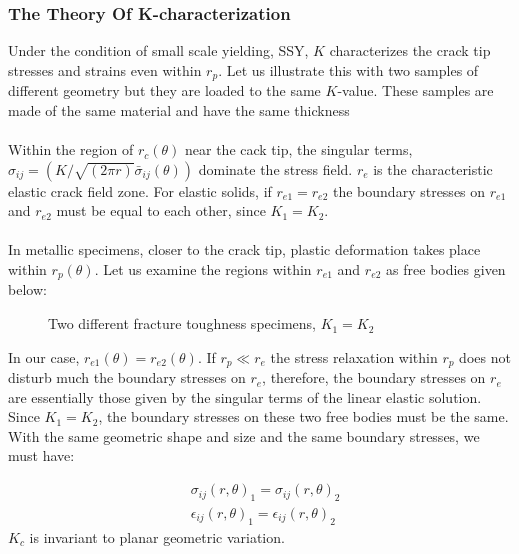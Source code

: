 \documentclass[11pt]{article}
\begin{document}
\subsubsection{The Theory Of K-characterization}
Under the condition of small scale yielding, SSY, $K$ characterizes the crack tip stresses and strains
even within $r_p$. Let us illustrate this with two samples of different geometry but they are loaded to the
same $K$-value. These samples are made of the same material and have the same thickness
\\\\
Within the region of $r_c(\theta)$ near the cack tip, the singular terms, $\sigma_{ij} = (K/\sqrt{(2 \pi r)} \bar{\sigma}_{ij}(\theta))$
dominate the stress field. $r_e$ is the characteristic elastic crack field zone. For elastic solids, if $r_{e1} = r_{e2}$ the boundary
stresses on $r_{e1}$ and $r_{e2}$ must be equal to each other, since $K_1 = K_2$.
\\\\
In metallic specimens, closer to the crack tip, plastic deformation takes place within $r_p(\theta)$. Let us
examine the regions within $r_{e1}$ and $r_{e2}$ as free bodies given below:
\begin{figure}[H]
    \centering
    \captionsetup{labelformat=empty}
    \caption{Two different fracture toughness specimens, $K_1 = K_2$ }
\end{figure}
In our case, $r_{e1}(\theta) = r_{e2}(\theta)$. If $r_p \ll r_e$ the
stress relaxation within $r_p$ does not disturb much the boundary stresses on $r_e$, therefore, the boundary
stresses on $r_e$ are essentially those given by the singular terms of the linear elastic solution. Since
$K_1 = K_2$, the boundary stresses on these two free bodies must be the same. With the same geometric
shape and size and the same boundary stresses, we must have:

\begin{align*}
    &\sigma_{ij}(r, \theta)_1 = \sigma_{ij}(r, \theta)_2 \\
    &\epsilon_{ij}(r, \theta)_1 = \epsilon_{ij}(r, \theta)_2 \tag{8} \label{8}
\end{align*}
$K_c$ is invariant to planar geometric variation.
 
\end{document}
